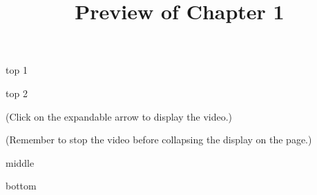 \documentclass{ximera}
\title{Preview of Chapter 1}
\begin{document}
\begin{abstract}
\end{abstract}

\maketitle



top 1


top 2

\begin{explanation}
(Click on the expandable arrow to display the video.)

\begin{expandable}

\begin{center}
\end{center}

(Remember to stop the video before collapsing the display on the page.)


\end{expandable}

\end{explanation}

middle


\begin{expandable}

\begin{center}
\end{center}

\end{expandable}





bottom
\end{document}
